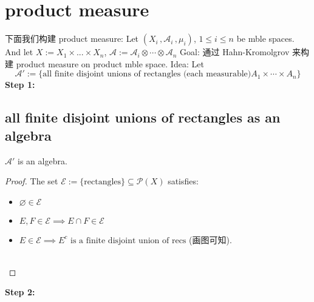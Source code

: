 \documentclass[lang=cn,11pt]{elegantbook}
\begin{document}
\section{product measure}
下面我们构建 product measure: 
Let $(X_i \,,\mathcal{A}_i\, , \mu_i)$, $1 \leq i \leq n$ be mble spaces.\\
    And let $X := X_1 \times ... \times X_n$, $\mathcal{A}:= \mathcal{A}_i \otimes \cdots \otimes \mathcal{A}_n$
Goal: 通过 Hahn-Kromolgrov 来构建 product measure on product mble space.
Idea: Let $$\mathcal{A}' := \{   \text{all finite disjoint unions of rectangles (each measurable)} A_1 \times \cdots \times A_n\}$$
\textbf{Step 1: }
\subsection{all finite disjoint unions of rectangles as an algebra}
\begin{proposition}
   $\mathcal{A}'$ is an algebra.
\end{proposition}
\begin{proof}
The set $\mathcal{E}:= \{\text{rectangles}\} \subseteq \mathcal{P}(X)$ satisfies:
    \begin{itemize}
        \item $\varnothing \in \mathcal{E}$
        \item $E,F \in \mathcal{E} \implies E \cap F \in \mathcal{E}$
        \item $E \in \mathcal{ E} \implies E^c \text{ is a finite disjoint union of recs}$ (画图可知).\\\\
    \end{itemize}
\end{proof}

\textbf{Step 2: }
\end{document}
